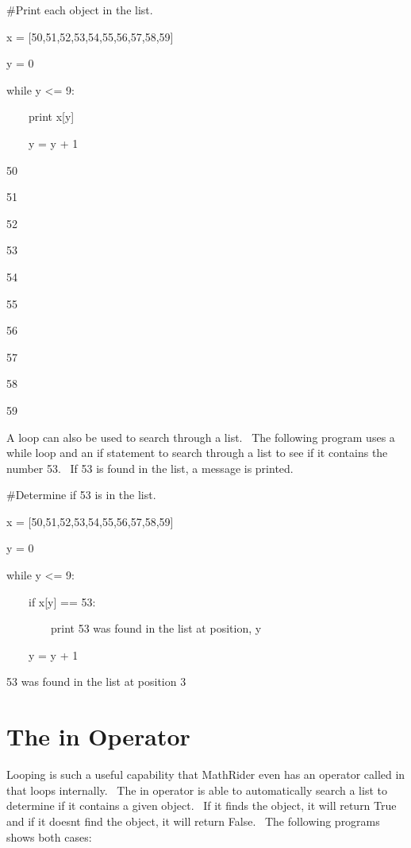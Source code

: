 \documentclass[12pt,twoside]{book}
\begin{document}
\bigskip

\#Print each object in the list.

x = [50,51,52,53,54,55,56,57,58,59]

y = 0

while y {\textless}= 9:

\ \ \ \ print x[y]

\ \ \ \ y = y + 1

{\textbar}

50

51

52

53

54

55

56

57

58

59


\bigskip

A loop can also be used to search through a list. \ The following
program uses a while loop and an if statement to search through a list
to see if it contains the number 53. \ If 53 is found in the list, a
message is printed.


\bigskip

\#Determine if 53 is in the list.

x = [50,51,52,53,54,55,56,57,58,59]

y = 0

while y {\textless}= 9:

\ \ \ \ if x[y] == 53:

\ \ \ \ \ \ \ \ print {\textquotedbl}53 was found in the list at
position{\textquotedbl}, y

\ \ \ \ y = y + 1

{\textbar}

53 was found in the list at position 3

\section[The in Operator]{The in Operator}
Looping is such a useful capability that MathRider even has an operator
called in that loops internally. \ The in operator is able to
automatically search a list to determine if it contains a given object.
\ If it finds the object, it will return True and if it
doesn{\textquotesingle}t find the object, it will return False. \ The
following programs shows both cases: 


\bigskip
\end{document}
